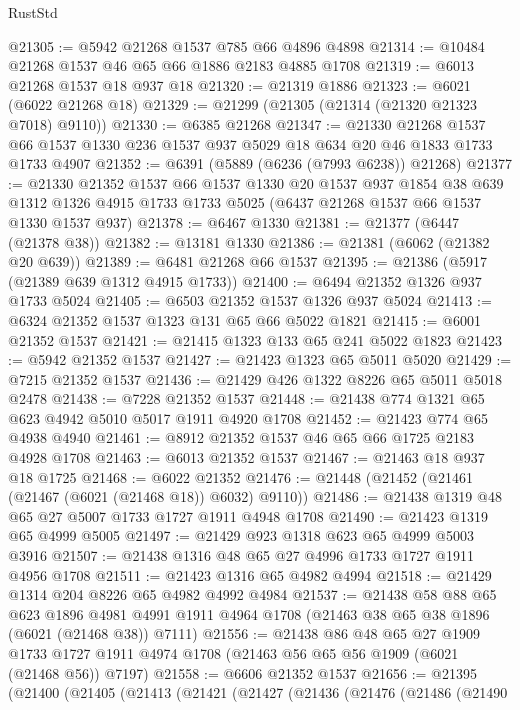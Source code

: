 \begin{lexlean}{RustStd}
\begin{coremodule}
@21305 := @5942 @21268 @1537 @785 @66 @4896 @4898
@21314 := @10484 @21268 @1537 @46 @65 @66 @1886 @2183 @4885 @1708
@21319 := @6013 @21268 @1537 @18 @937 @18
@21320 := @21319 @1886
@21323 := @6021 (@6022 @21268 @18)
@21329 := @21299 (@21305 (@21314 (@21320 @21323 @7018) @9110))
@21330 := @6385 @21268
@21347 := @21330
    @21268
    @1537
    @66
    @1537
    @1330
    @236
    @1537
    @937
    @5029
    @18
    @634
    @20
    @46
    @1833
    @1733
    @1733
    @4907
@21352 := @6391 (@5889 (@6236 (@7993 @6238)) @21268)
@21377 := @21330
    @21352
    @1537
    @66
    @1537
    @1330
    @20
    @1537
    @937
    @1854
    @38
    @639
    @1312
    @1326
    @4915
    @1733
    @1733
    @5025
    (@6437 @21268 @1537 @66 @1537 @1330 @1537 @937)
@21378 := @6467 @1330
@21381 := @21377 (@6447 (@21378 @38))
@21382 := @13181 @1330
@21386 := @21381 (@6062 (@21382 @20 @639))
@21389 := @6481 @21268 @66 @1537
@21395 := @21386 (@5917 (@21389 @639 @1312 @4915 @1733))
@21400 := @6494 @21352 @1326 @937 @1733 @5024
@21405 := @6503 @21352 @1537 @1326 @937 @5024
@21413 := @6324 @21352 @1537 @1323 @131 @65 @66 @5022 @1821
@21415 := @6001 @21352 @1537
@21421 := @21415 @1323 @133 @65 @241 @5022 @1823
@21423 := @5942 @21352 @1537
@21427 := @21423 @1323 @65 @5011 @5020
@21429 := @7215 @21352 @1537
@21436 := @21429 @426 @1322 @8226 @65 @5011 @5018 @2478
@21438 := @7228 @21352 @1537
@21448 := @21438 @774 @1321 @65 @623 @4942 @5010 @5017 @1911 @4920 @1708
@21452 := @21423 @774 @65 @4938 @4940
@21461 := @8912 @21352 @1537 @46 @65 @66 @1725 @2183 @4928 @1708
@21463 := @6013 @21352 @1537
@21467 := @21463 @18 @937 @18 @1725
@21468 := @6022 @21352
@21476 := @21448 (@21452 (@21461 (@21467 (@6021 (@21468 @18)) @6032) @9110))
@21486 := @21438 @1319 @48 @65 @27 @5007 @1733 @1727 @1911 @4948 @1708
@21490 := @21423 @1319 @65 @4999 @5005
@21497 := @21429 @923 @1318 @623 @65 @4999 @5003 @3916
@21507 := @21438 @1316 @48 @65 @27 @4996 @1733 @1727 @1911 @4956 @1708
@21511 := @21423 @1316 @65 @4982 @4994
@21518 := @21429 @1314 @204 @8226 @65 @4982 @4992 @4984
@21537 := @21438
    @58
    @88
    @65
    @623
    @1896
    @4981
    @4991
    @1911
    @4964
    @1708
    (@21463 @38 @65 @38 @1896 (@6021 (@21468 @38)) @7111)
@21556 := @21438
    @86
    @48
    @65
    @27
    @1909
    @1733
    @1727
    @1911
    @4974
    @1708
    (@21463 @56 @65 @56 @1909 (@6021 (@21468 @56)) @7197)
@21558 := @6606 @21352 @1537
@21656 := @21395
    (@21400
      (@21405
        (@21413
          (@21421
            (@21427
              (@21436
                (@21476
                  (@21486
                    (@21490

\end{coremodule}
\end{lexlean}
